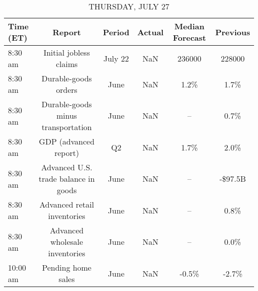 \documentclass{article}%
\begin{document}
%


\begin{table}[htbp]%
\caption{THURSDAY, JULY 27}%
\centering%
\begin{adjustbox}{width=1\textwidth}%
\begin{tabular}{lccccc}
\toprule
Time (ET) &                               Report &  Period & Actual & Median Forecast & Previous \\
\midrule
  8:30 am &               Initial jobless claims & July 22 &    NaN &          236000 &   228000 \\
  8:30 am &                 Durable-goods orders &    June &    NaN &            1.2\% &     1.7\% \\
  8:30 am &   Durable-goods minus transportation &    June &    NaN &              -- &     0.7\% \\
  8:30 am &                GDP (advanced report) &      Q2 &    NaN &            1.7\% &     2.0\% \\
  8:30 am & Advanced U.S. trade balance in goods &    June &    NaN &              -- &  -\$97.5B \\
  8:30 am &          Advanced retail inventories &    June &    NaN &              -- &     0.8\% \\
  8:30 am &       Advanced wholesale inventories &    June &    NaN &              -- &     0.0\% \\
 10:00 am &                   Pending home sales &    June &    NaN &           -0.5\% &    -2.7\% \\
\bottomrule
\end{tabular}
%
\end{adjustbox}%
\end{table}

%
\end{document}
